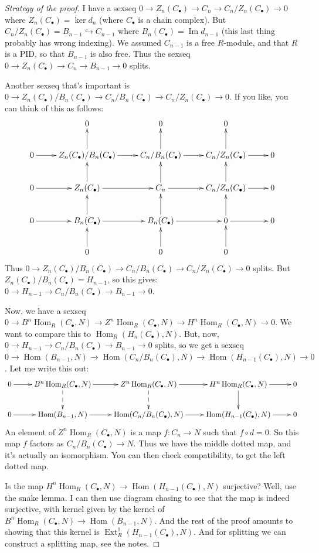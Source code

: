 \documentclass{amsart}
\theoremstyle{theorem}
\theoremstyle{definition}
\DeclareMathOperator{\Ext}{Ext}
\DeclareMathOperator{\Hom}{Hom}
\DeclareMathOperator{\img}{Im}
\begin{document}
\begin{proof}[Strategy of the proof]
I have a sexseq $0\to Z_n(C_\bullet)\to C_n\to C_n/Z_n(C_\bullet)\to 0$ where $Z_n(C_\bullet)=\ker d_n$ (where $C_\bullet$ is a chain complex). But $C_n/Z_n(C_\bullet)=B_{n-1}\hookrightarrow C_{n-1}$ where $B_n(C_\bullet)=\img d_{n-1}$ (this last thing probably has wrong indexing). We assumed $C_{n-1}$ is a free $R$-module, and that $R$ is a PID, so that $B_{n-1}$ is also free. Thus the sexseq $0\to Z_n(C_\bullet)\to C_n\to B_{n-1}\to 0$ splits.

Another sexseq that's important is $0\to Z_n(C_\bullet)/B_n(C_\bullet)\to C_n/B_n(C_\bullet)\to C_n/Z_n(C_\bullet)\to 0$. If you like, you can think of this as follows:
\begin{equation*}
\xymatrix{
	& 0 & 0 & 0 & \\
	0\ar[r] & Z_n(C_\bullet)/B_n(C_\bullet)\ar[r]\ar[u] & C_n/B_n(C_\bullet)\ar[r]\ar[u] & C_n/Z_n(C_\bullet)\ar[r]\ar[u] & 0\\
	0\ar[r] & Z_n(C_\bullet)\ar[r]\ar[u] & C_n\ar[r]\ar[u] & C_n/Z_n(C_\bullet)\ar[r]\ar[u] & 0\\
	0\ar[r] & B_n(C_\bullet)\ar[r]\ar[u] & B_n(C_\bullet)\ar[r]\ar[u] & 0\ar[r]\ar[u] & 0\\
	& 0\ar[u] & 0\ar[u] & 0\ar[u] &
}
\end{equation*}
Thus $0\to Z_n(C_\bullet)/B_n(C_\bullet)\to C_n/B_n(C_\bullet)\to C_n/Z_n(C_\bullet)\to 0$ splits. But $Z_n(C_\bullet)/B_n(C_\bullet)= H_{n-1}$, so this gives: $0\to H_{n-1}\to C_n/B_n(C_\bullet)\to B_{n-1}\to 0$.

Now, we have a sexseq $0\to B^n\Hom_R(C_\bullet,N)\to Z^n\Hom_R(C_\bullet,N)\to H^n\Hom_R(C_\bullet,N)\to 0$. We want to compare this to $\Hom_R( H_n(C_\bullet),N)$. But, now, $0\to H_{n-1}\to C_n/B_n(C_\bullet)\to B_{n-1}\to 0$ splits, so we get a sexseq $0\to \Hom(B_{n-1},N)\to \Hom(C_n/B_n(C_\bullet),N)\to\Hom( H_{n-1}(C_\bullet),N)\to 0$. Let me write this out:
\begin{equation*}
\xymatrix{
	0\ar[r] & B^n\Hom_R(C_\bullet,N) \ar[r]\ar@{-->}[d] & Z^n\Hom_R(C_\bullet,N) \ar[r]\ar@{-->}[d] & H^n\Hom_R(C_\bullet,N) \ar[r]\ar[d] & 0\\
	0 \ar[r] & \Hom(B_{n-1},N) \ar[r] & \Hom(C_n/B_n(C_\bullet),N)\ar[r] & \Hom( H_{n-1}(C_\bullet),N) \ar[r] & 0
}
\end{equation*}
An element of $Z^n\Hom_R(C_\bullet,N)$ is a map $f:C_n\to N$ such that $f\circ d=0$. So this map $f$ factors as $C_n/B_n(C_\bullet)\to N$. Thus we have the middle dotted map, and it's actually an isomorphism. You can then check compatibility, to get the left dotted map.

Is the map $ H^n\Hom_R(C_\bullet,N)\to\Hom( H_{n-1}(C_\bullet),N)$ surjective? Well, use the snake lemma. I can then use diagram chasing to see that the map is indeed surjective, with kernel given by the kernel of $B^n\Hom_R(C_\bullet,N)\to \Hom(B_{n-1},N)$. And the rest of the proof amounts to showing that this kernel is $\Ext^1_R( H_{n-1}(C_\bullet),N)$. And for splitting we can construct a splitting map, see the notes.
\end{proof}
\end{document}
